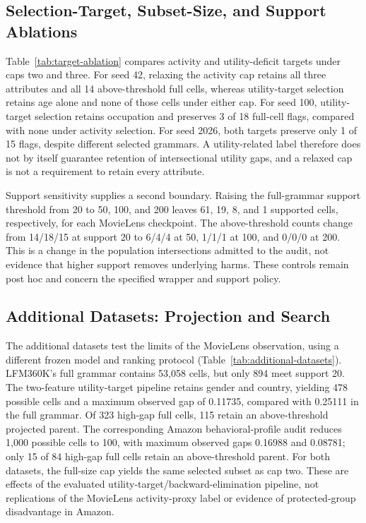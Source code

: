 \subsection{Selection-Target, Subset-Size, and Support Ablations}

Table~\ref{tab:target-ablation} compares activity and utility-deficit targets under caps two and three. For seed 42, relaxing the activity cap retains all three attributes and all 14 above-threshold full cells, whereas utility-target selection retains age alone and none of those cells under either cap. For seed 100, utility-target selection retains occupation and preserves 3 of 18 full-cell flags, compared with none under activity selection. For seed 2026, both targets preserve only 1 of 15 flags, despite different selected grammars. A utility-related label therefore does not by itself guarantee retention of intersectional utility gaps, and a relaxed cap is not a requirement to retain every attribute.

Support sensitivity supplies a second boundary. Raising the full-grammar support threshold from 20 to 50, 100, and 200 leaves 61, 19, 8, and 1 supported cells, respectively, for each MovieLens checkpoint. The above-threshold counts change from 14/18/15 at support 20 to 6/4/4 at 50, 1/1/1 at 100, and 0/0/0 at 200. This is a change in the population intersections admitted to the audit, not evidence that higher support removes underlying harms. These controls remain post hoc and concern the specified wrapper and support policy.

\subsection{Additional Datasets: Projection and Search}


The additional datasets test the limits of the MovieLens observation, using a different frozen model and ranking protocol (Table~\ref{tab:additional-datasets}). LFM360K's full grammar contains 53,058 cells, but only 894 meet support 20. The two-feature utility-target pipeline retains gender and country, yielding 478 possible cells and a maximum observed gap of 0.11735, compared with 0.25111 in the full grammar. Of 323 high-gap full cells, 115 retain an above-threshold projected parent. The corresponding Amazon behavioral-profile audit reduces 1,000 possible cells to 100, with maximum observed gaps 0.16988 and 0.08781; only 15 of 84 high-gap full cells retain an above-threshold parent. For both datasets, the full-size cap yields the same selected subset as cap two. These are effects of the evaluated utility-target/backward-elimination pipeline, not replications of the MovieLens activity-proxy label or evidence of protected-group disadvantage in Amazon.

